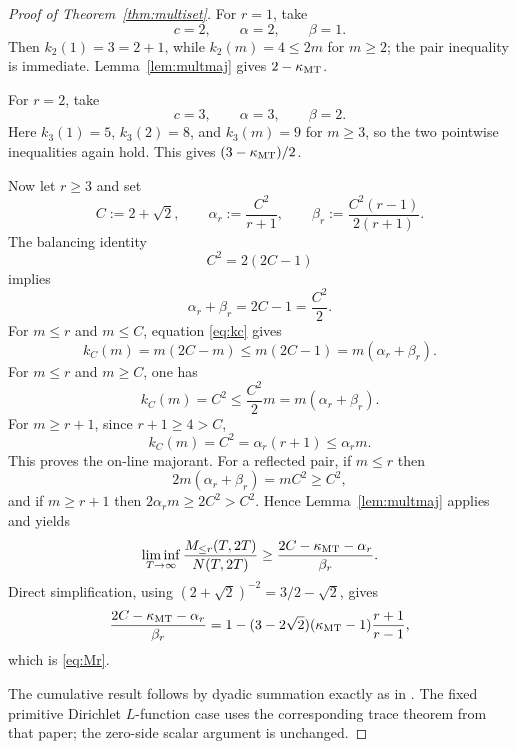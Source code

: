 \begin{proof}[Proof of Theorem~\ref{thm:multiset}]
For $r=1$, take
\[
c=2,\qquad \alpha=2,\qquad \beta=1.
\]
Then $k_2(1)=3=2+1$, while $k_2(m)=4\leq2m$ for $m\geq2$; the pair inequality is immediate.  Lemma~\ref{lem:multmaj} gives $2-\kappa_{\mathrm{MT}}$.

For $r=2$, take
\[
c=3,\qquad \alpha=3,\qquad \beta=2.
\]
Here $k_3(1)=5$, $k_3(2)=8$, and $k_3(m)=9$ for $m\geq3$, so the two pointwise inequalities again hold.  This gives $(3-\kappa_{\mathrm{MT}})/2$.

Now let $r\geq3$ and set
\begin{equation}\label{eq:Cdef}
C:=2+\sqrt2,
\qquad
\alpha_r:=\frac{C^2}{r+1},
\qquad
\beta_r:=\frac{C^2(r-1)}{2(r+1)}.
\end{equation}
The balancing identity
\begin{equation}\label{eq:balance}
C^2=2(2C-1)
\end{equation}
implies
\[
\alpha_r+\beta_r=2C-1=\frac{C^2}{2}.
\]
For $m\leq r$ and $m\leq C$, equation \eqref{eq:kc} gives
\[
k_C(m)=m(2C-m)\leq m(2C-1)=m(\alpha_r+\beta_r).
\]
For $m\leq r$ and $m\geq C$, one has
\[
k_C(m)=C^2\leq \frac{C^2}{2}m=m(\alpha_r+\beta_r).
\]
For $m\geq r+1$, since $r+1\geq4>C$,
\[
k_C(m)=C^2=\alpha_r(r+1)\leq\alpha_rm.
\]
This proves the on-line majorant.  For a reflected pair, if $m\leq r$ then
\[
2m(\alpha_r+\beta_r)=mC^2\geq C^2,
\]
and if $m\geq r+1$ then $2\alpha_rm\geq2C^2>C^2$.  Hence Lemma~\ref{lem:multmaj} applies and yields
\[
\liminf_{T\to\infty}\frac{M_{\leq r}(T,2T)}{N(T,2T)}
\geq
\frac{2C-\kappa_{\mathrm{MT}}-\alpha_r}{\beta_r}.
\]
Direct simplification, using $(2+\sqrt2)^{-2}=3/2-\sqrt2$, gives
\[
\frac{2C-\kappa_{\mathrm{MT}}-\alpha_r}{\beta_r}
=1-(3-2\sqrt2)(\kappa_{\mathrm{MT}}-1)\frac{r+1}{r-1},
\]
which is \eqref{eq:Mr}.

The cumulative result follows by dyadic summation exactly as in \cite{Claude2026}.  The fixed primitive Dirichlet $L$-function case uses the corresponding trace theorem from that paper; the zero-side scalar argument is unchanged.
\end{proof}
